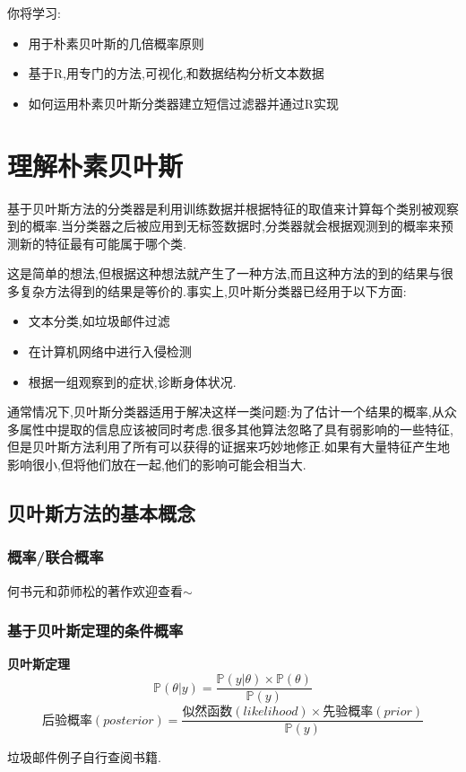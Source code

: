 \documentclass[11pt,a4paper,oneside]{book}
\begin{document}
你将学习:
\begin{itemize}
	\item 用于朴素贝叶斯的几倍概率原则
	\item 基于R,用专门的方法,可视化,和数据结构分析文本数据
	\item 如何运用朴素贝叶斯分类器建立短信过滤器并通过R实现
\end{itemize}
\section{理解朴素贝叶斯}
基于贝叶斯方法的分类器是利用训练数据并根据特征的取值来计算每个类别被观察到的概率.当分类器之后被应用到无标签数据时,分类器就会根据观测到的概率来预测新的特征最有可能属于哪个类.

这是简单的想法,但根据这种想法就产生了一种方法,而且这种方法的到的结果与很多复杂方法得到的结果是等价的.事实上,贝叶斯分类器已经用于以下方面:
\begin{itemize}
	\item 文本分类,如垃圾邮件过滤
	\item 在计算机网络中进行入侵检测
	\item 根据一组观察到的症状,诊断身体状况.
\end{itemize}

通常情况下,贝叶斯分类器适用于解决这样一类问题:为了估计一个结果的概率,从众多属性中提取的信息应该被同时考虑.很多其他算法忽略了具有弱影响的一些特征,但是贝叶斯方法利用了所有可以获得的证据来巧妙地修正.如果有大量特征产生地影响很小,但将他们放在一起,他们的影响可能会相当大.
\subsection{贝叶斯方法的基本概念}
\subsubsection{概率/联合概率}
何书元和茆师松的著作欢迎查看$\sim$
\subsubsection{基于贝叶斯定理的条件概率}
\begin{tcolorbox}[colback=blue!7!white,colframe=blue!40]
\textbf{贝叶斯定理}
\begin{equation}
\mathbb{P}(\theta|y)=\frac{\mathbb{P}(y|\theta)\times\mathbb{P}(\theta)}{\mathbb{P}(y)}
\end{equation}
\begin{equation}
\mbox{后验概率}(posterior)=
\frac{\mbox{似然函数}(likelihood)\times\mbox{先验概率}(prior)}{\mathbb{P}(y)}
\end{equation}
\end{tcolorbox}
垃圾邮件例子自行查阅书籍.
\end{document}
